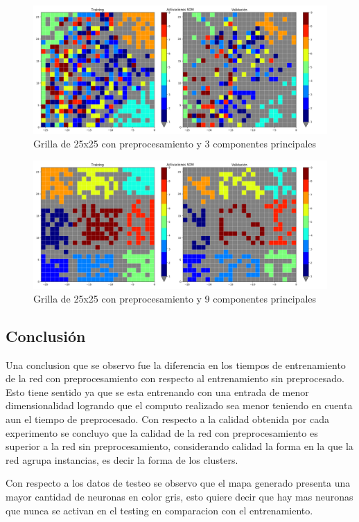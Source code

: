 \begin{figure}[H]
  \includegraphics[width=160mm]{imagenes/som_25_25_3_preprocess.png}
  \caption{Grilla de 25x25 con preprocesamiento y 3 componentes principales}
\end{figure}

\begin{figure}[H]
  \includegraphics[width=160mm]{imagenes/som_25_25_9_preprocess.png}
  \caption{Grilla de 25x25 con preprocesamiento y 9 componentes principales}
\end{figure}

\subsection{Conclusión}
Una conclusion que se observo fue la diferencia en los tiempos de entrenamiento de la red con preprocesamiento
con respecto al entrenamiento sin preprocesado. Esto tiene sentido ya que se esta entrenando con una entrada de menor
dimensionalidad logrando que el computo realizado sea menor teniendo en cuenta aun el tiempo de  preprocesado.
 Con respecto a la calidad obtenida por cada experimento
se concluyo que la calidad de la red con preprocesamiento es superior a la red sin preprocesamiento, considerando calidad
la forma en la que la red agrupa instancias, es decir la forma de los clusters.

Con respecto a los datos de testeo se observo que el mapa generado presenta una mayor cantidad de neuronas en color gris,
esto quiere decir que hay mas neuronas que nunca se activan en el testing en comparacion con el entrenamiento.

